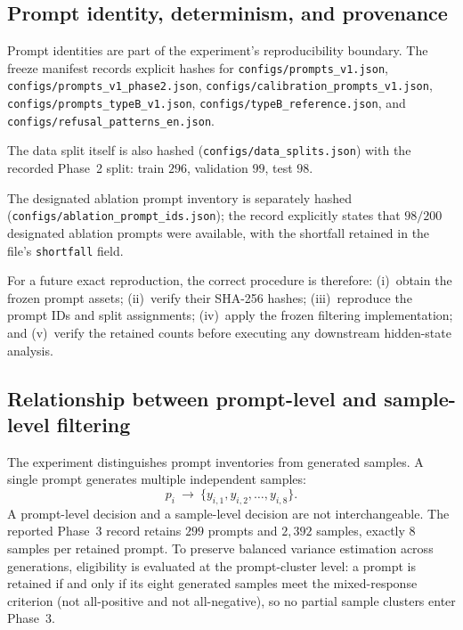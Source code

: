 \documentclass{article}
\begin{document}
\subsection{Prompt identity, determinism, and provenance}
\label{app:b-prov}

Prompt identities are part of the experiment's reproducibility boundary.
The freeze manifest records explicit hashes for
\texttt{configs/prompts\_v1.json},
\texttt{configs/prompts\_v1\_phase2.json},
\texttt{configs/calibration\_prompts\_v1.json},
\texttt{configs/prompts\_typeB\_v1.json},
\texttt{configs/typeB\_reference.json}, and
\texttt{configs/refusal\_patterns\_en.json}.

The data split itself is also hashed
(\texttt{configs/data\_splits.json})
with the recorded Phase~2 split: train $296$, validation $99$, test $98$.

The designated ablation prompt inventory is separately hashed
(\texttt{configs/ablation\_prompt\_ids.json});
the record explicitly states that $98/200$ designated ablation prompts were available, with the shortfall retained in the file's \texttt{shortfall} field.

For a future exact reproduction, the correct procedure is therefore:
(i)~obtain the frozen prompt assets;
(ii)~verify their {SHA-256} hashes;
(iii)~reproduce the prompt {IDs} and split assignments;
(iv)~apply the frozen filtering implementation; and
(v)~verify the retained counts before executing any downstream hidden-state analysis.

\subsection{Relationship between prompt-level and sample-level filtering}
\label{app:b-units}

The experiment distinguishes prompt inventories from generated samples.
A single prompt generates multiple independent samples:
\begin{equation}
  p_i\ \rightarrow\ \{y_{i,1},y_{i,2},\ldots,y_{i,8}\}.
\end{equation}
A prompt-level decision and a sample-level decision are not interchangeable.
The reported Phase~3 record retains $299$ prompts and $2{,}392$ samples, exactly $8$ samples per retained prompt.
To preserve balanced variance estimation across generations, eligibility is evaluated at the prompt-cluster level: a prompt is retained if and only if its eight generated samples meet the mixed-response criterion (not all-positive and not all-negative), so no partial sample clusters enter Phase~3.
\end{document}
